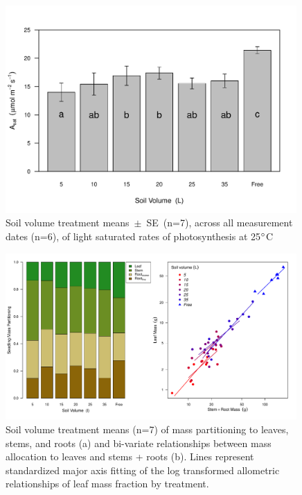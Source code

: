 \documentclass[a4paper]{article}\usepackage[]{graphicx}\usepackage[]{color}
\begin{document}
\begin{figure}[h!]
    \centering
    \includegraphics[width=0.99\textwidth]{Asat.pdf}
    \caption{Soil volume treatment means~$\pm$~SE~(n=7), across all measurement dates (n=6), of light saturated rates of photosynthesis at 25$\degree$C}
    \label{fig:figure3}
\end{figure}

\begin{figure}[h!]
    \centering
    \includegraphics[width=0.99\textwidth]{massfractions.pdf}
    \caption{Soil volume treatment means (n=7) of mass partitioning to leaves, stems, and roots (a) and bi-variate relationships between mass allocation to leaves and stems + roots (b). Lines represent standardized major axis fitting of the log transformed allometric relationships of leaf mass fraction by treatment.}
    \label{fig:figure4}
\end{figure}
\end{document}

